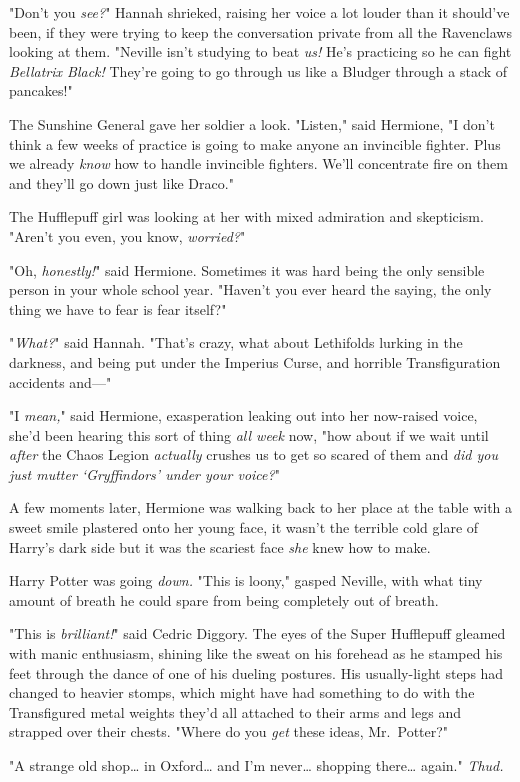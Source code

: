 "Don't you \emph{see?}" Hannah shrieked, raising her voice a lot louder than it 
should've been, if they were trying to keep the conversation private from all 
the Ravenclaws looking at them. "Neville isn't studying to beat \emph{us!} He's 
practicing so he can fight \emph{Bellatrix Black!} They're going to go through 
us like a Bludger through a stack of pancakes!"

The Sunshine General gave her soldier a look. "Listen," said Hermione, "I don't 
think a few weeks of practice is going to make anyone an invincible fighter. 
Plus we already \emph{know} how to handle invincible fighters. We'll 
concentrate fire on them and they'll go down just like Draco."

The Hufflepuff girl was looking at her with mixed admiration and skepticism. 
"Aren't you even, you know, \emph{worried?}"

"Oh, \emph{honestly!}" said Hermione. Sometimes it was hard being the only 
sensible person in your whole school year. "Haven't you ever heard the saying, 
the only thing we have to fear is fear itself?"

"\emph{What?}" said Hannah. "That's crazy, what about Lethifolds lurking in the 
darkness, and being put under the Imperius Curse, and horrible Transfiguration 
accidents and---"

"I \emph{mean,}" said Hermione, exasperation leaking out into her now-raised 
voice, she'd been hearing this sort of thing \emph{all week} now, "how about if 
we wait until \emph{after} the Chaos Legion \emph{actually} crushes us to get 
so scared of them and \emph{did you just mutter `Gryffindors' under your 
voice?}"

A few moments later, Hermione was walking back to her place at the table with a 
sweet smile plastered onto her young face, it wasn't the terrible cold glare of 
Harry's dark side but it was the scariest face \emph{she} knew how to make.

Harry Potter was going \emph{down.}
\sbreak
"This is loony," gasped Neville, with what tiny amount of breath he could spare 
from being completely out of breath.

"This is \emph{brilliant!}" said Cedric Diggory. The eyes of the Super 
Hufflepuff gleamed with manic enthusiasm, shining like the sweat on his 
forehead as he stamped his feet through the dance of one of his dueling 
postures. His usually-light steps had changed to heavier stomps, which might 
have had something to do with the Transfigured metal weights they'd all 
attached to their arms and legs and strapped over their chests. "Where do you 
\emph{get} these ideas, Mr.~Potter?"

"A strange old shop{\ldots} in Oxford{\ldots} and I'm never{\ldots} shopping 
there{\ldots} again." \emph{Thud.}
